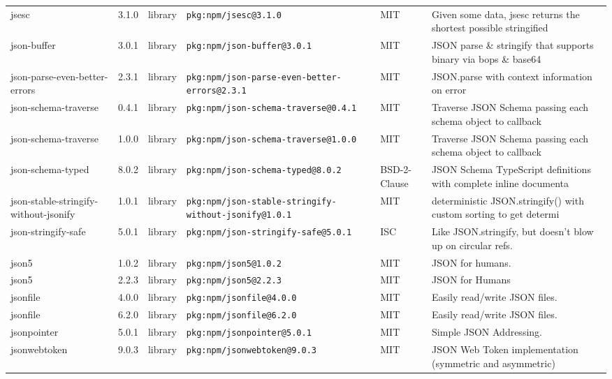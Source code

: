\documentclass[11pt,a4paper]{article}
\begin{document}
\begin{longtable}{|p{4cm}|p{2cm}|p{1.6cm}|p{5cm}|p{1.5cm}|p{3.5cm}|}
\raggedright jsesc & 3.1.0 & library & \small\texttt{pkg:npm/jsesc@3.1.0} & MIT & \small Given some data, jsesc returns the shortest possible stringified  \\
\raggedright json-buffer & 3.0.1 & library & \small\texttt{pkg:npm/json-buffer@3.0.1} & MIT & \small JSON parse \& stringify that supports binary via bops \& base64 \\
\raggedright json-parse-even-better-errors & 2.3.1 & library & \small\texttt{pkg:npm/json-parse-even-better-errors@2.3.1} & MIT & \small JSON.parse with context information on error \\
\raggedright json-schema-traverse & 0.4.1 & library & \small\texttt{pkg:npm/json-schema-traverse@0.4.1} & MIT & \small Traverse JSON Schema passing each schema object to callback \\
\raggedright json-schema-traverse & 1.0.0 & library & \small\texttt{pkg:npm/json-schema-traverse@1.0.0} & MIT & \small Traverse JSON Schema passing each schema object to callback \\
\raggedright json-schema-typed & 8.0.2 & library & \small\texttt{pkg:npm/json-schema-typed@8.0.2} & BSD-2-Clause & \small JSON Schema TypeScript definitions with complete inline documenta \\
\raggedright json-stable-stringify-without-jsonify & 1.0.1 & library & \small\texttt{pkg:npm/json-stable-stringify-without-jsonify@1.0.1} & MIT & \small deterministic JSON.stringify() with custom sorting to get determi \\
\raggedright json-stringify-safe & 5.0.1 & library & \small\texttt{pkg:npm/json-stringify-safe@5.0.1} & ISC & \small Like JSON.stringify, but doesn't blow up on circular refs. \\
\raggedright json5 & 1.0.2 & library & \small\texttt{pkg:npm/json5@1.0.2} & MIT & \small JSON for humans. \\
\raggedright json5 & 2.2.3 & library & \small\texttt{pkg:npm/json5@2.2.3} & MIT & \small JSON for Humans \\
\raggedright jsonfile & 4.0.0 & library & \small\texttt{pkg:npm/jsonfile@4.0.0} & MIT & \small Easily read/write JSON files. \\
\raggedright jsonfile & 6.2.0 & library & \small\texttt{pkg:npm/jsonfile@6.2.0} & MIT & \small Easily read/write JSON files. \\
\raggedright jsonpointer & 5.0.1 & library & \small\texttt{pkg:npm/jsonpointer@5.0.1} & MIT & \small Simple JSON Addressing. \\
\raggedright jsonwebtoken & 9.0.3 & library & \small\texttt{pkg:npm/jsonwebtoken@9.0.3} & MIT & \small JSON Web Token implementation (symmetric and asymmetric) \\

\end{longtable}
\end{document}
